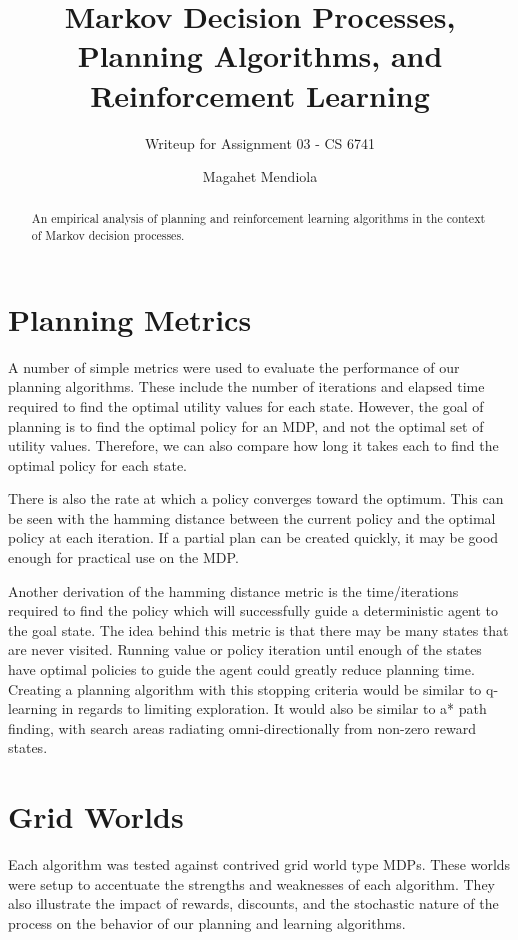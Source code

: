 \documentclass{sig-alternate}
\begin{document}
\title{Markov Decision Processes, Planning Algorithms, and Reinforcement Learning}
\subtitle{Writeup for Assignment 03 - CS 6741}

\author{
\alignauthor
Magahet Mendiola
}
\date{}

\maketitle
\begin{abstract}
An empirical analysis of planning and reinforcement learning algorithms in the context of Markov decision processes.
\end{abstract}

\section{Planning Metrics}
A number of simple metrics were used to evaluate the performance of our planning algorithms. These include the number of iterations and elapsed time required to find the optimal utility values for each state. However, the goal of planning is to find the optimal policy for an MDP, and not the optimal set of utility values. Therefore, we can also compare how long it takes each to find the optimal policy for each state.

There is also the rate at which a policy converges toward the optimum. This can be seen with the hamming distance between the current policy and the optimal policy at each iteration. If a partial plan can be created quickly, it may be good enough for practical use on the MDP.

Another derivation of the hamming distance metric is the time/iterations required to find the policy which will successfully guide a deterministic agent to the goal state. The idea behind this metric is that there may be many states that are never visited. Running value or policy iteration until enough of the states have optimal policies to guide the agent could greatly reduce planning time. Creating a planning algorithm with this stopping criteria would be similar to q-learning in regards to limiting exploration. It would also be similar to a* path finding, with search areas radiating omni-directionally from non-zero reward states.


\section{Grid Worlds}

Each algorithm was tested against contrived grid world type MDPs. These worlds were setup to accentuate the strengths and weaknesses of each algorithm. They also illustrate the impact of rewards, discounts, and the stochastic nature of the process on the behavior of our planning and learning algorithms. 
\end{document}
